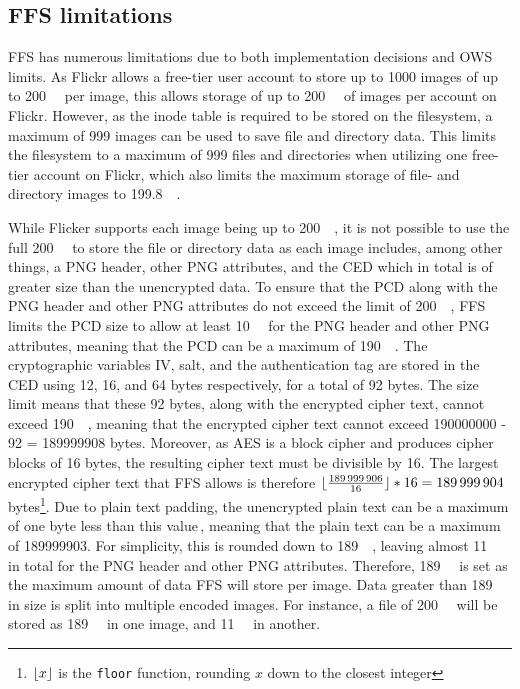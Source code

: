 \subsection{FFS limitations}
\label{subsec:ffs_limits}
\gls{FFS} has numerous limitations due to both implementation decisions and \gls{OWS} limits. As Flickr allows a \mbox{free-tier} user account to store up to \num{1000} images of up to \SI{200}{\mega\byte} per image, this allows storage of up to \SI{200}{\giga\byte} of images per account on Flickr. However, as the inode table is required to be stored on the filesystem, a maximum of 999 images can be used to save file and directory data. This limits the filesystem to a maximum of 999 files and directories when utilizing one \mbox{free-tier} account on Flickr, which also limits the maximum storage of file- and directory images to \SI{199.8}{\giga\byte}.

While Flicker supports each image being up to \SI{200}{\mega\byte}, it is not possible to use the full \SI{200}{\mega\byte} to store the file or directory data as each image includes, among other things, a PNG header, other PNG attributes, and the \gls{CED} which in total is of greater size than the unencrypted data. To ensure that the \gls{PCD} along with the PNG header and other PNG attributes do not exceed the limit of \SI{200}{\mega\byte}, \gls{FFS} limits the \gls{PCD} size to allow at least \SI{10}{\mega\byte} for the PNG header and other PNG attributes, meaning that the \gls{PCD} can be a maximum of \SI{190}{\mega\byte}. The cryptographic variables \gls{IV}, salt, and the authentication tag are stored in the \gls{CED} using 12, 16, and 64 bytes respectively, for a total of 92 bytes. The size limit means that these 92 bytes, along with the encrypted cipher text, cannot exceed \SI{190}{\mega\byte}, meaning that the encrypted cipher text cannot exceed \num{190000000} - 92 = \num{189999908} bytes. Moreover, as \gls{AES} is a block cipher and produces cipher blocks of 16 bytes, the resulting cipher text must be divisible by 16. The largest encrypted cipher text that \gls{FFS} allows is therefore $\lfloor \frac{\num{189999906}}{16} \rfloor*16 = \num{189999904}$ bytes\footnote{$\lfloor x \rfloor$ is the \texttt{floor} function, rounding $x$ down to the closest integer}. Due to plain text padding, the unencrypted plain text can be a maximum of one byte less than this value\,\cite{z.z.coderAnswerSizeData2010}, meaning that the plain text can be a maximum of \SI{189999903}{\byte}. For simplicity, this is rounded down to \SI{189}{\mega\byte}, leaving almost \SI{11}{\mega\byte} in total for the PNG header and other PNG attributes. Therefore, \SI{189}{\mega\byte} is set as the maximum amount of data \gls{FFS} will store per image. Data greater than \SI{189}{\mega\byte} in size is split into multiple encoded images. For instance, a file of \SI{200}{\mega\byte} will be stored as \SI{189}{\mega\byte} in one image, and \SI{11}{\mega\byte} in another. 

